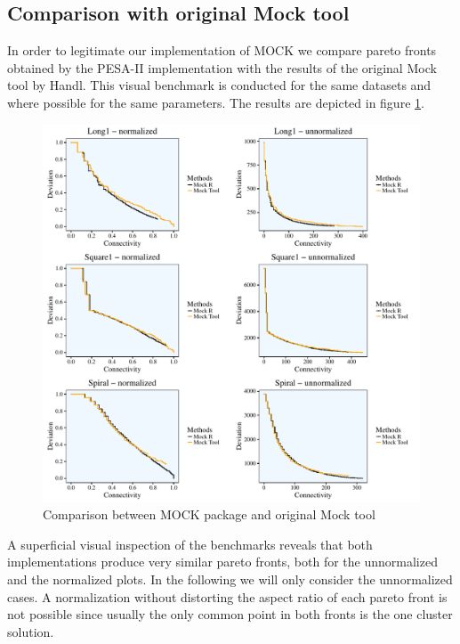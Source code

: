 \documentclass[parskip=half,DIV=14]{scrartcl}\usepackage[]{graphicx}\usepackage[]{color}
\begin{document}
\subsection{Comparison with original Mock tool}

In order to legitimate our implementation of MOCK we compare pareto fronts obtained by the PESA-II implementation with the results of the original Mock tool by Handl. This visual benchmark is conducted for the same datasets and where possible for the same parameters. 
The results are depicted in figure \ref{fig:comparison}.

\begin{figure}[h]
\begin{center}
\includegraphics[scale=0.75]{figure/comparisonMockTool.pdf}
\caption{Comparison between MOCK package and original Mock tool}
\label{fig:comparison}
\end{center}
\end{figure}

A superficial visual inspection of the benchmarks reveals that both implementations produce very similar pareto fronts, both for the unnormalized and the normalized plots. In the following we will only consider the unnormalized cases. A normalization without distorting the aspect ratio of each pareto front is not possible since usually the only common point in both fronts is the one cluster solution.
\end{document}
